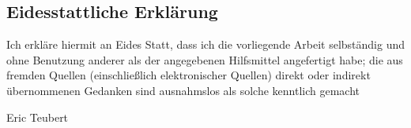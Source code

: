 \clearpage{\pagestyle{empty}\cleardoublepage}

\setcounter{tocdepth}{3}
\tableofcontents
\newpage
\listoffigures
\lstlistoflistings
\clearpage


\thispagestyle{empty}
\subsection*{Eidesstattliche Erklärung}
Ich erkläre hiermit an Eides Statt, dass ich die vorliegende Arbeit
selbständig und ohne Benutzung anderer als der angegebenen Hilfsmittel
angefertigt habe; die aus fremden Quellen (einschließlich elektronischer
Quellen) direkt oder indirekt übernommenen Gedanken sind ausnahmslos als
solche kenntlich gemacht

\vspace{2cm}

\noindent Eric Teubert

\clearpage{\pagestyle{empty}\cleardoublepage}